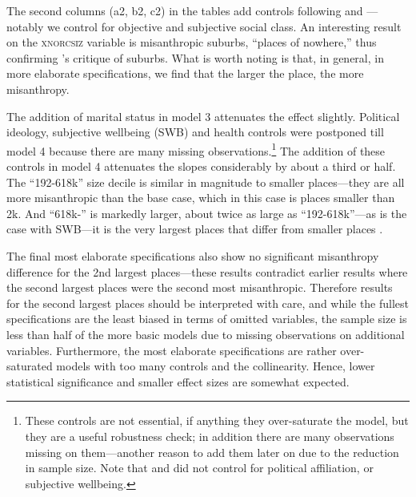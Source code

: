 \documentclass[11pt, letterpaper]{article}
\begin{document}
\begin{spacing}{1.4}
The second columns (a2, b2, c2) in the tables add controls following \citet{welch07} and \citet{smith97}---notably we control for objective and subjective social class. An interesting result on the \textsc{xnorcsiz} variable is misanthropic suburbs, ``places of nowhere,'' thus confirming \citet{kunstler12}'s critique of suburbs.
What is worth noting is that, in general, in more elaborate specifications, we find that the larger the place, the more misanthropy. 

The addition of marital status in model 3 attenuates the effect slightly. Political ideology, subjective wellbeing (SWB) and health controls were postponed till model 4 because there are many missing observations.\footnote{These controls are not essential, if anything they over-saturate the model, but they are a useful robustness check; in addition there are many observations missing on them---another reason to add them later on due to the reduction in sample size. Note that \citet{smith97} and \citet{wilson85} did not control for political affiliation, or subjective wellbeing.} 
The addition of these controls in model 4 attenuates the slopes considerably by about a third or half. The ``192-618k'' size decile is similar in magnitude to smaller places---they are all  more misanthropic than the base case, which in this case is places smaller than 2k. And ``618k-'' is markedly larger, about twice as large as ``192-618k''---as is the case with SWB---it is the very largest places that differ from smaller places \citep{aokCityBook15}. 

The final most elaborate specifications also show no significant misanthropy difference for the 2nd largest places---these results contradict earlier results where the second largest places were the second most misanthropic. Therefore results for the second largest places should be interpreted with care, and while the fullest specifications are the least biased in terms of omitted variables, the sample size is less than half of the more basic models due to missing observations on additional variables. Furthermore, the most elaborate specifications are rather over-saturated models with too many controls and the collinearity. Hence, lower statistical significance and smaller effect sizes are somewhat expected. 


\end{spacing}
\end{document}

